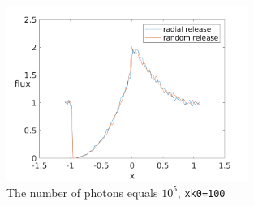 \documentclass[../main/main.tex]{subfiles}
\begin{document}
\begin{figure}[!htbp]
\centering
\includegraphics[width=0.7\textwidth]{../../introductory_exercises/P_Cygni_profile_UV_resonance/data/compare_radial_xk0100.png}
\caption{The number of photons equals $10^{5}$, \texttt{xk0=100}}
\label{PCyg_mu_eq_1}
\end{figure}
\end{document}
